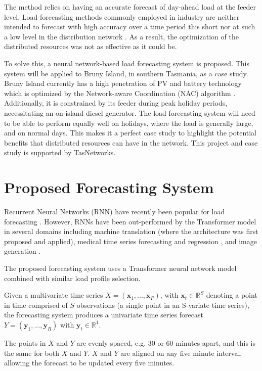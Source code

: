 \documentclass[conference]{IEEEtran}
\begin{document}
The method relies on having an accurate forecast of day-ahead load at the feeder level.
Load forecasting methods commonly employed in industry are neither intended to forecast with high accuracy over a time period this short nor at such a low level in the distribution network \cite{CIGRE2016}.
As a result, the optimization of the distributed resources was not as effective as it could be.
\par
To solve this, a neural network-based load forecasting system is proposed.
This system will be applied to Bruny Island, in southern Tasmania, as a case study.
Bruny Island currently has a high penetration of PV and battery technology which is optimized by the Network-aware Coordination (NAC) algorithm \cite{Evan2016}.
Additionally, it is constrained by its feeder during peak holiday periods, necessitating an on-island diesel generator. The load forecasting system will need to be able to perform equally well on holidays, where the load is generally large, and on normal days. 
This makes it a perfect case study to highlight the potential benefits that distributed resources can have in the network.
This project and case study is supported by TasNetworks.


\section{Proposed Forecasting System}
Recurrent Neural Networks (RNN) have recently been popular for load forecasting \cite{Kong2018}.
However, RNNs have been out-performed by the Transformer \cite{Vaswani2017} model in several domains including machine translation \cite{Vaswani2017} (where the architecture was first proposed and applied), medical time series forecasting and regression \cite{Song2017}, and image generation \cite{Parmar2018}.
\par
The proposed forecasting system uses a Transformer neural network model combined with similar load profile selection.
\par
Given a multivariate time series $X = (\boldsymbol{x}_1, ..., \boldsymbol{x}_P)$, with $\boldsymbol{x}_t \in \mathbb{R}^S$ denoting a point in time comprised of $S$ observations (a single point in an S-variate time series), the forecasting system produces a univariate time series forecast $Y = (\boldsymbol{y}_1, ..., \boldsymbol{y}_R)$ with $\boldsymbol{y}_t \in \mathbb{R}^1$.
\par
The points in $X$ and $Y$ are evenly spaced, e.g. 30 or 60 minutes apart, and this is the same for both $X$ and $Y$.
$X$ and $Y$ are aligned on any five minute interval, allowing the forecast to be updated every five minutes.
\end{document}
